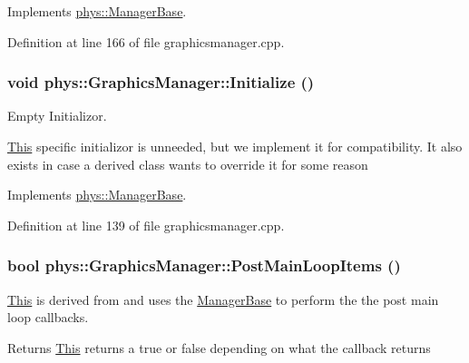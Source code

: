 Implements \hyperlink{classphys_1_1ManagerBase_aff400b6599db635e24796d8221e9a0e3}{phys::ManagerBase}.



Definition at line 166 of file graphicsmanager.cpp.

\hypertarget{classphys_1_1GraphicsManager_a554572de5d1cdce37aa1760d6e6e039c}{
\subsubsection[{Initialize}]{\setlength{\rightskip}{0pt plus 5cm}void phys::GraphicsManager::Initialize ()}}
\label{dd/d63/classphys_1_1GraphicsManager_a554572de5d1cdce37aa1760d6e6e039c}


Empty Initializor. 

\hyperlink{structThis}{This} specific initializor is unneeded, but we implement it for compatibility. It also exists in case a derived class wants to override it for some reason 

Implements \hyperlink{classphys_1_1ManagerBase_a57dd8e54e767427d5bdcc86dc66d73ed}{phys::ManagerBase}.



Definition at line 139 of file graphicsmanager.cpp.

\hypertarget{classphys_1_1GraphicsManager_ae2330172be150cd4d12aa2ed62b0474c}{
\subsubsection[{PostMainLoopItems}]{\setlength{\rightskip}{0pt plus 5cm}bool phys::GraphicsManager::PostMainLoopItems ()}}
\label{dd/d63/classphys_1_1GraphicsManager_ae2330172be150cd4d12aa2ed62b0474c}


\hyperlink{structThis}{This} is derived from and uses the \hyperlink{classphys_1_1ManagerBase}{ManagerBase} to perform the the post main loop callbacks. 

\begin{DoxyReturn}{Returns}
\hyperlink{structThis}{This} returns a true or false depending on what the callback returns 
\end{DoxyReturn}


